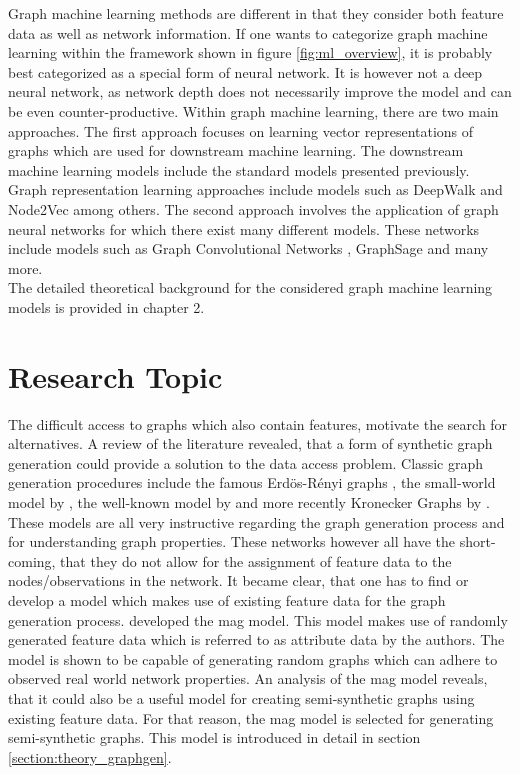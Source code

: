 	\noindent Graph machine learning methods are different in that they consider 
	both feature data as well as network information. If one wants to categorize 
	graph machine learning within the framework shown in figure 
	\ref{fig:ml_overview}, it is probably best categorized as a special form of 
	neural network. It is however not a deep neural network, as network depth 
	does not necessarily improve the model and can be even counter-productive. 
	Within graph machine learning, there are two main approaches. The first 
	approach focuses on learning vector representations of graphs which are 
	used for downstream machine learning. The downstream machine learning models 
	include the standard models presented previously. Graph representation 
	learning approaches include models such as DeepWalk 
	\citep{perozzi2014deepwalk} and Node2Vec \citep{grover2016node2vec} among 
	others. The second approach involves the application of graph neural 
	networks for which there exist many different models. These networks 
	include models such as Graph Convolutional Networks \citep{kipf2016semi}, 
	GraphSage \citep{hamilton2017inductive} and many more. \\

	\noindent The detailed theoretical background for the considered graph
	machine learning models is provided in chapter 2.

	\section{Research Topic}
	\label{section:research_topics}

	\noindent The difficult access to graphs which also contain features, 
	motivate the search for alternatives. A review of the literature revealed, 
	that a form of synthetic graph generation could provide a solution to the data 
	access problem. Classic graph generation procedures include the famous 
	Erdös-Rényi graphs \citeyearpar{erdos1959random}, the small-world model by 
	\cite{watts1998collective}, the well-known model by 
	\cite{barabasi1999emergence} and more recently Kronecker Graphs by
	\cite{leskovec2010kronecker}. These models are all very instructive
	regarding the graph generation process and for understanding graph
	properties. These networks however all have the short-coming, that they do 
	not allow for the assignment of feature data to the nodes/observations in the
	network. It became clear, that one has to find or develop a model which 
	makes use of existing feature data for the graph generation process. 
	\cite{kim2012multiplicative} developed the \ac{mag} model. This model makes 
	use of randomly generated feature data which is referred to as attribute data 
	by the authors. The model is shown to be capable of generating random graphs 
	which can adhere to observed real world network properties. An analysis of 
	the \ac{mag} model reveals, that it could also be a useful model for 
	creating semi-synthetic graphs using existing feature data. For that reason, 
	the \ac{mag} model is selected for generating semi-synthetic graphs. This 
	model is introduced in detail in section \ref{section:theory_graphgen}. \\

